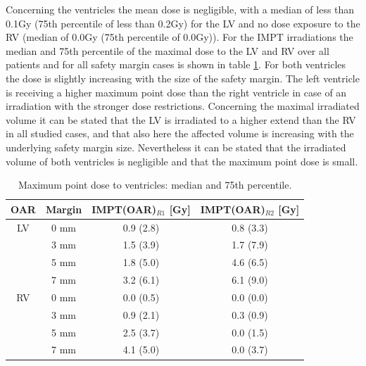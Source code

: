 \newpage


Concerning the ventricles the mean dose is negligible, with a median of less than 0.1Gy (75th percentile of less than 0.2Gy) for 
the LV and no dose exposure to the RV (median of 0.0Gy (75th percentile of 0.0Gy)).  
For the IMPT irradiations the median and 75th percentile of the maximal dose to the LV and RV over all patients and for all safety margin 
cases is shown in table \ref{tab:maxdose_ventricle}. For both ventricles the dose is slightly increasing with the size of the safety 
margin. The left ventricle is receiving a higher maximum point dose than the right ventricle in case of an irradiation with the stronger 
dose restrictions. Concerning the maximal 
irradiated volume it can be stated that the LV is irradiated to a higher extend than the RV in all studied cases, and that also here 
the affected volume is increasing with the underlying safety margin size. Nevertheless it can be stated that the irradiated volume of 
both ventricles is negligible and that the maximum point dose is small. 


\begin{table}[H]
  \centering
      \footnotesize
  \caption{Maximum point dose to ventricles: median and 75th percentile.}
  \begin{tabular}{|c|c|c|c|}
    \hline\hline
    OAR & Margin & IMPT(OAR)$_{R1}$ [Gy] & IMPT(OAR)$_{R2}$ [Gy] \\
    \hline
    LV & 0 mm & 0.9 (2.8) & 0.8 (3.3) \\
    & 3 mm & 1.5 (3.9) & 1.7 (7.9) \\
    & 5 mm & 1.8 (5.0) & 4.6 (6.5) \\
    & 7 mm & 3.2 (6.1) & 6.1 (9.0) \\
    \hline
    RV & 0 mm & 0.0 (0.5) & 0.0 (0.0) \\
    & 3 mm & 0.9 (2.1) & 0.3 (0.9) \\
    & 5 mm & 2.5 (3.7) & 0.0 (1.5) \\
    & 7 mm & 4.1 (5.0) & 0.0 (3.7) \\
    \hline\hline
  \end{tabular}
  \label{tab:maxdose_ventricle}
\end{table}


